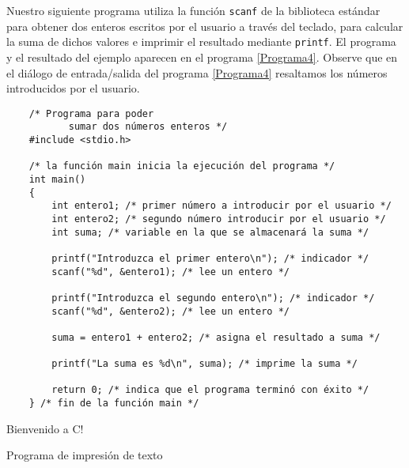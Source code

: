 Nuestro siguiente programa utiliza la función \texttt{scanf} de la biblioteca estándar para obtener dos enteros escritos por el usuario a través del teclado, para calcular la suma de dichos valores e imprimir el resultado mediante \texttt{printf}. El programa y el resultado del ejemplo aparecen en el programa \ref{Programa4}. Observe que en el diálogo de entrada/salida del programa \ref{Programa4} resaltamos los números introducidos por el usuario.
\begin{listing}[h!]
\begin{verbatim}
    /* Programa para poder
           sumar dos números enteros */
    #include <stdio.h>
    
    /* la función main inicia la ejecución del programa */
    int main()
    {
        int entero1; /* primer número a introducir por el usuario */
        int entero2; /* segundo número introducir por el usuario */
        int suma; /* variable en la que se almacenará la suma */

        printf("Introduzca el primer entero\n"); /* indicador */
        scanf("%d", &entero1); /* lee un entero */

        printf("Introduzca el segundo entero\n"); /* indicador */
        scanf("%d", &entero2); /* lee un entero */

        suma = entero1 + entero2; /* asigna el resultado a suma */

        printf("La suma es %d\n", suma); /* imprime la suma */
        
        return 0; /* indica que el programa terminó con éxito */
    } /* fin de la función main */
\end{verbatim}
\begin{compilado}
    Bienvenido a C!
\end{compilado}
\caption{Programa de impresión de texto}\label{Programa4}
\end{listing}